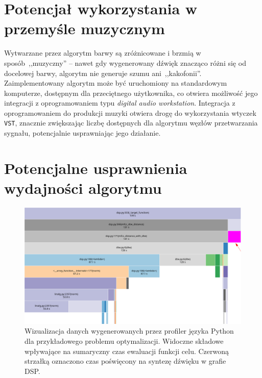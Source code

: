 

\section{Potencjał wykorzystania w przemyśle muzycznym}

Wytwarzane przez algorytm barwy są zróżnicowane i brzmią
w sposób~,,muzyczny'' -- nawet gdy wygenerowany dźwięk
znacząco różni się od docelowej barwy, algorytm nie generuje
szumu ani~,,kakofonii''. 
Zaimplementowany algorytm może być uruchomiony na standardowym komputerze,
dostępnym dla przeciętnego użytkownika, co otwiera możliwość jego integracji
z oprogramowaniem typu \textit{digital audio workstation}. Integracja
z oprogramowaniem do produkcji muzyki otwiera drogę do wykorzystania
wtyczek \texttt{VST}, znacznie zwiększając liczbę dostępnych
dla algorytmu węzłów przetwarzania sygnału, potencjalnie usprawniając
jego działanie.


\section{Potencjalne usprawnienia wydajności algorytmu}

\begin{figure}[H]
    \centering
    \includegraphics[width=1.0\linewidth]{rys07/profile_target_function_execution.png}
    \caption{
      Wizualizacja danych wygenerowanych przez profiler języka Python
      dla przykładowego problemu optymalizacji. Widoczne składowe wpływające
      na sumaryczny czas ewaluacji funkcji celu.
      Czerwoną strzałką oznaczono czas poświęcony
      na syntezę dźwięku w grafie DSP\@.
    }\label{fig:target_function_profiling}
\end{figure}

